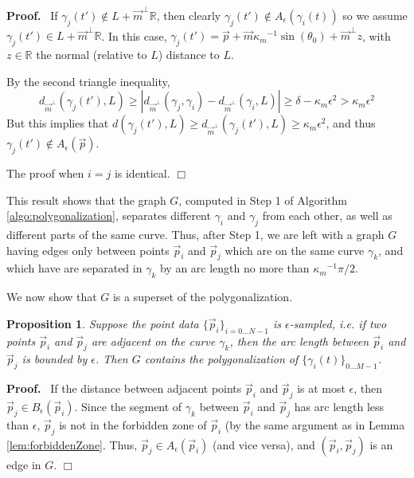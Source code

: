 \documentclass{article}
\newcommand{\nin}{\not\in}
\newtheorem{proposition}[cntr]{Proposition}
\newenvironment{proof}{
  \noindent\textbf{Proof.}\ }{\hspace*{\fill}
  \begin{math}\Box\end{math}\medskip}
\numberwithin{cntr}{section}
\numberwithin{equation}{section}
\newcommand{\abs}[1]{\left| #1 \right|}%
\newcommand{\RR}[0]{{\mathbb{R}}}
\newcommand{\vp}[0]{{\vec{p}}}
\newcommand{\vm}[0]{{\vec{m}}}
\newcommand{\Oto}[1]{{0 \ldots #1-1}}
\newcommand{\OtoN}{{0 \ldots N-1}}
\newcommand{\pointData}{{ \{ \vp_{i} \}_{i=\OtoN} }}
\newcommand{\curveSet}{{ \{ \gamma_i(t) \}_{\Oto{M}}}}
\newcommand{\ball}[2]{ { B_{#1}(#2) } }
\newcommand{\allowed}[2]{ { A_{#1}(#2) } }
\newcommand{\curvemax}{{\kappa_{m}}}
\newcommand{\curvemaxi}{{\curvemax^{-1}}}
\begin{document}
\begin{proof}
If $\gamma_{j}(t') \nin L+\vm^{\perp} \RR$, then clearly $\gamma_{j}(t') \nin \allowed{\epsilon}{\gamma_{i}(t)}$ so we assume $\gamma_{j}(t') \in L+\vm^{\perp} \RR$. In this case, $\gamma_{j}(t') = \vp + \vm \curvemaxi \sin(\theta_{0}) + \vm^\perp z$, with $z \in \RR$ the normal (relative to $L$) distance to $L$.

By the second triangle inequality,
\begin{equation*}
  d_{\vm^{\perp}}(\gamma_{j}(t'), L) \geq \abs{d_{\vm^{\perp}}(\gamma_{j}, \gamma_{i}) -  d_{\vm^{\perp}}(\gamma_{i}, L)}
  \geq \delta - \curvemax \epsilon^{2} > \curvemax \epsilon^{2}
\end{equation*}
But this implies that $d(\gamma_{j}(t'), L) \geq d_{\vm^{\perp}}(\gamma_{j}(t'), L) \geq \curvemax \epsilon^{2}$, and thus $\gamma_{j}(t') \nin \allowed{\epsilon}{\vp}$.

The proof when $i=j$ is identical.
\end{proof}

This result shows that the graph $G$, computed in Step 1 of Algorithm \ref{algo:polygonalization}, separates different $\gamma_{i}$ and $\gamma_{j}$ from each other, as well as different parts of the same curve. Thus, after Step 1, we are left with a graph $G$ having edges only between points $\vp_{i}$ and $\vp_{j}$ which are on the same curve $\gamma_{k}$, and which have are separated in $\gamma_{k}$ by an arc length no more than $\curvemaxi \pi/2$.

We now show that $G$ is a superset of the polygonalization.

\begin{proposition}
  \label{prop:polyIncludesNeighboringPoints}
  Suppose the point data $\pointData$ is $\epsilon$-sampled, i.e. if two points $\vp_{i}$ and $\vp_{j}$ are adjacent on the curve $\gamma_{k}$, then the \emph{arc length} between $\vp_{i}$ and $\vp_{j}$ is bounded by $\epsilon$. Then $G$ contains the polygonalization of $\curveSet$.
\end{proposition}
\begin{proof}
  If the distance between adjacent points $\vp_{i}$ and $\vp_{j}$ is at most $\epsilon$, then $\vp_{j} \in \ball{\epsilon}{\vp_{i}}$. Since the segment of $\gamma_{k}$ between $\vp_{i}$ and $\vp_{j}$ has arc length less than $\epsilon$, $\vp_{j}$ is not in the forbidden zone of $\vp_{i}$ (by the same argument as in Lemma \ref{lem:forbiddenZone}. Thus, $\vp_{j} \in \allowed{\epsilon}{\vp_{i}}$ (and vice versa), and $(\vp_{i},\vp_{j})$ is an edge in $G$.
\end{proof}
\end{document}
